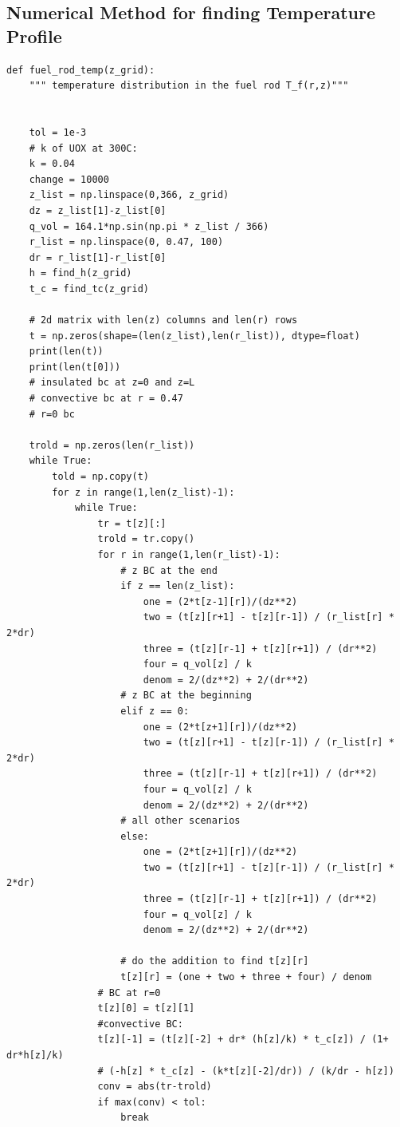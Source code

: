 \documentclass[12pt,letterpaper]{article}
\begin{document}
\begin{appendices}
\section{Numerical Method for finding Temperature Profile}
\begin{verbatim}
def fuel_rod_temp(z_grid):
    """ temperature distribution in the fuel rod T_f(r,z)"""


    tol = 1e-3
    # k of UOX at 300C:
    k = 0.04 
    change = 10000
    z_list = np.linspace(0,366, z_grid)
    dz = z_list[1]-z_list[0]
    q_vol = 164.1*np.sin(np.pi * z_list / 366)
    r_list = np.linspace(0, 0.47, 100)
    dr = r_list[1]-r_list[0]
    h = find_h(z_grid)
    t_c = find_tc(z_grid)

    # 2d matrix with len(z) columns and len(r) rows
    t = np.zeros(shape=(len(z_list),len(r_list)), dtype=float)
    print(len(t))
    print(len(t[0]))
    # insulated bc at z=0 and z=L
    # convective bc at r = 0.47
    # r=0 bc

    trold = np.zeros(len(r_list))
    while True:
        told = np.copy(t)
        for z in range(1,len(z_list)-1):
            while True:
                tr = t[z][:]
                trold = tr.copy()
                for r in range(1,len(r_list)-1):
                    # z BC at the end
                    if z == len(z_list):
                        one = (2*t[z-1][r])/(dz**2)
                        two = (t[z][r+1] - t[z][r-1]) / (r_list[r] * 2*dr)
                        three = (t[z][r-1] + t[z][r+1]) / (dr**2)
                        four = q_vol[z] / k
                        denom = 2/(dz**2) + 2/(dr**2) 
                    # z BC at the beginning
                    elif z == 0:
                        one = (2*t[z+1][r])/(dz**2)
                        two = (t[z][r+1] - t[z][r-1]) / (r_list[r] * 2*dr)
                        three = (t[z][r-1] + t[z][r+1]) / (dr**2)
                        four = q_vol[z] / k
                        denom = 2/(dz**2) + 2/(dr**2) 
                    # all other scenarios
                    else:
                        one = (2*t[z+1][r])/(dz**2)
                        two = (t[z][r+1] - t[z][r-1]) / (r_list[r] * 2*dr)
                        three = (t[z][r-1] + t[z][r+1]) / (dr**2)
                        four = q_vol[z] / k
                        denom = 2/(dz**2) + 2/(dr**2) 

                    # do the addition to find t[z][r]
                    t[z][r] = (one + two + three + four) / denom
                # BC at r=0
                t[z][0] = t[z][1]
                #convective BC:
                t[z][-1] = (t[z][-2] + dr* (h[z]/k) * t_c[z]) / (1+ dr*h[z]/k)
                # (-h[z] * t_c[z] - (k*t[z][-2]/dr)) / (k/dr - h[z])
                conv = abs(tr-trold)
                if max(conv) < tol:
                    break


\end{verbatim}
\end{appendices}
\end{document}
